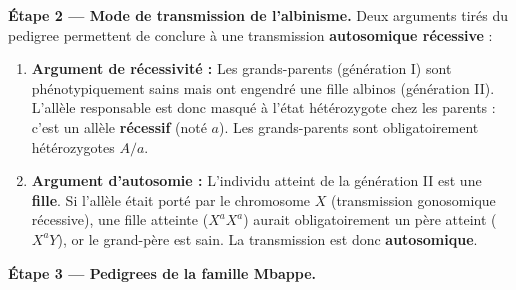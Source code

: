 \documentclass[11pt]{article}
\begin{document}
\begin{exoresolu}
\textbf{Étape 2 — Mode de transmission de l'albinisme.}
Deux arguments tirés du pedigree permettent de conclure à une transmission \textbf{autosomique récessive} :
\begin{enumerate}
\item \textbf{Argument de récessivité :} Les grands-parents (génération I) sont phénotypiquement sains mais ont engendré une fille albinos (génération II). L'allèle responsable est donc masqué à l'état hétérozygote chez les parents : c'est un allèle \textbf{récessif} (noté $a$). Les grands-parents sont obligatoirement hétérozygotes $A/a$.
\item \textbf{Argument d'autosomie :} L'individu atteint de la génération II est une \textbf{fille}. Si l'allèle était porté par le chromosome $X$ (transmission gonosomique récessive), une fille atteinte ($X^a X^a$) aurait obligatoirement un père atteint ($X^a Y$), or le grand-père est sain. La transmission est donc \textbf{autosomique}.
\end{enumerate}

\textbf{Étape 3 — Pedigrees de la famille Mbappe.}


\end{exoresolu}
\end{document}
